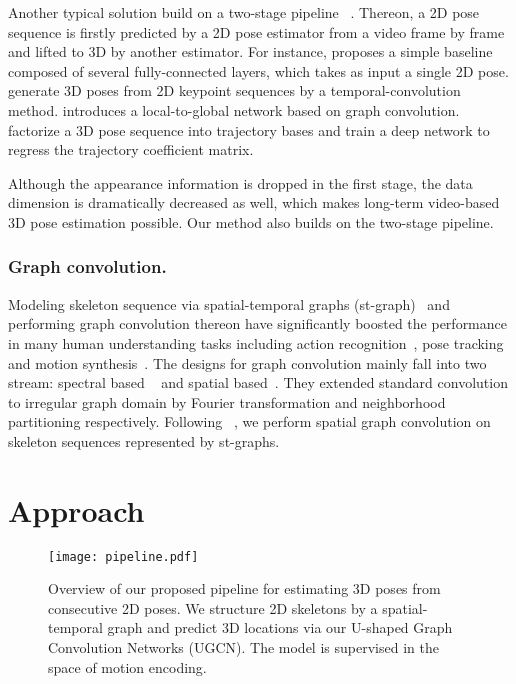 \documentclass[runningheads]{llncs}
\begin{document}
Another typical solution build on a two-stage pipeline
~\cite{martinez2017simple,pavllo20193d,cai2019exploiting,lin2019trajectory}.
Thereon, a 2D pose sequence is firstly predicted by a 2D pose estimator from a video frame by frame
and lifted to 3D by another estimator. For instance,
\cite{martinez2017simple} proposes a simple baseline composed of several fully-connected layers,
which takes as input a single 2D pose.
\cite{pavllo20193d} generate 3D poses from 2D keypoint sequences by a temporal-convolution method.
\cite{cai2019exploiting} introduces a local-to-global network based on graph convolution.
\cite{lin2019trajectory} factorize a 3D pose sequence into trajectory bases and train a deep network to regress the trajectory coefficient matrix.

Although the appearance information is dropped in the first stage,
the data dimension is dramatically decreased as well,
which makes long-term video-based 3D pose estimation possible.
Our method also builds on the two-stage pipeline.





\subsubsection{Graph convolution.}
Modeling skeleton sequence via spatial-temporal graphs (st-graph)~\cite{yan2018spatial} and performing graph convolution thereon
have significantly boosted the performance in many human understanding tasks including
action recognition~\cite{yan2018spatial},
pose tracking~\cite{ning2019lighttrack} and
motion synthesis~\cite{yan2019convolutional}.
The designs for graph convolution mainly fall into two stream:
spectral based ~\cite{defferrard2016convolutional,kipf2016semi} and spatial based~\cite{atwood2016diffusion,niepert2016learning}.
They extended standard convolution to irregular graph domain by Fourier transformation and neighborhood partitioning respectively.
Following ~\cite{yan2018spatial}, we perform spatial graph convolution on skeleton sequences represented by st-graphs.

\section{Approach}

\begin{figure*}[t]
    \centering
    \texttt{[image: pipeline.pdf]}
    \caption{\small
    Overview of our proposed pipeline for
    estimating 3D poses from consecutive 2D poses.
    We structure 2D skeletons by a spatial-temporal graph and predict 3D locations via
    our U-shaped Graph Convolution Networks (UGCN).
    The model is supervised in the space of motion encoding.
    }
\label{fig:pipeline}
\end{figure*}
\end{document}
